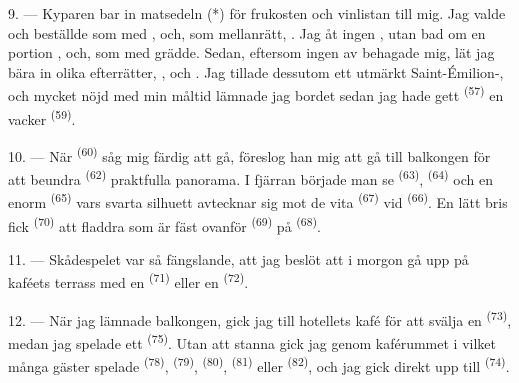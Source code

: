 
\VUsaut{4.0mm}
\VUsaut{3.0mm}

9. --- Kyparen bar in matsedeln (*) för frukosten och vinlistan till mig. Jag valde och
beställde som  med , och, som mellanrätt,
. Jag åt ingen , utan bad om en portion
, och, som  med grädde. Sedan, eftersom ingen av
 behagade mig, lät jag bära in olika efterrätter, ,
 och . Jag tillade dessutom ett utmärkt
Saint-Émilion-, och mycket nöjd med min måltid lämnade jag bordet sedan jag hade
gett  \textsuperscript{(57)} en vacker 
\textsuperscript{(59)}.

10. --- När  \textsuperscript{(60)} såg mig färdig att gå, föreslog han
mig att gå till balkongen för att beundra  \textsuperscript{(62)} praktfulla
panorama. I fjärran började man se
 \textsuperscript{(63)}, 
\textsuperscript{(64)} och en enorm  \textsuperscript{(65)} vars svarta
silhuett avtecknar sig mot de vita  \textsuperscript{(67)} vid
 \textsuperscript{(66)}. En lätt bris fick 
\textsuperscript{(70)} att fladdra som är fäst ovanför
 \textsuperscript{(69)} på 
\textsuperscript{(68)}.

\VUsaut{3.0mm}
\VUsaut{3.0mm}

11. --- Skådespelet var så fängslande, att jag beslöt att i morgon gå upp på kaféets terrass
med en  \textsuperscript{(71)} eller en
 \textsuperscript{(72)}.

12. --- När jag lämnade balkongen, gick jag till hotellets kafé för att svälja en
 \textsuperscript{(73)}, medan jag spelade ett 
\textsuperscript{(75)}. Utan att stanna gick jag genom kaférummet i vilket många gäster
spelade  \textsuperscript{(78)},
 \textsuperscript{(79)}, 
\textsuperscript{(80)},  \textsuperscript{(81)} eller
 \textsuperscript{(82)}, och jag gick direkt upp till
 \textsuperscript{(74)}.

